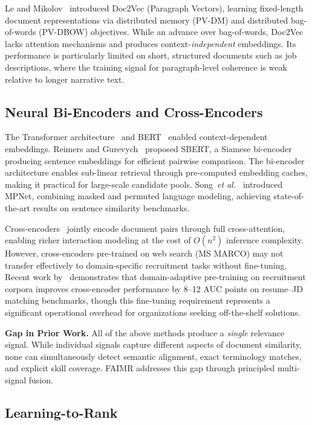 \documentclass[smallcondensed,numbers]{sn-jnl}
\begin{document}
Le and Mikolov~\cite{le2014doc2vec} introduced Doc2Vec (Paragraph Vectors), learning fixed-length document representations via distributed memory (PV-DM) and distributed bag-of-words (PV-DBOW) objectives. While an advance over bag-of-words, Doc2Vec lacks attention mechanisms and produces context-\textit{independent} embeddings. Its performance is particularly limited on short, structured documents such as job descriptions, where the training signal for paragraph-level coherence is weak relative to longer narrative text.

\subsection{Neural Bi-Encoders and Cross-Encoders}

The Transformer architecture~\cite{vaswani2017attention} and BERT~\cite{devlin2018bert} enabled context-dependent embeddings. Reimers and Gurevych~\cite{reimers2019sbert} proposed SBERT, a Siamese bi-encoder producing sentence embeddings for efficient pairwise comparison. The bi-encoder architecture enables sub-linear retrieval through pre-computed embedding caches, making it practical for large-scale candidate pools. Song~\textit{et al.}~\cite{song2020mpnet} introduced MPNet, combining masked and permuted language modeling, achieving state-of-the-art results on sentence similarity benchmarks.

Cross-encoders~\cite{nogueira2019crossencoder} jointly encode document pairs through full cross-attention, enabling richer interaction modeling at the cost of $O(n^2)$ inference complexity. However, cross-encoders pre-trained on web search (MS MARCO) may not transfer effectively to domain-specific recruitment tasks without fine-tuning. Recent work by~\cite{luo2023hire} demonstrates that domain-adaptive pre-training on recruitment corpora improves cross-encoder performance by 8--12 AUC points on resume--JD matching benchmarks, though this fine-tuning requirement represents a significant operational overhead for organizations seeking off-the-shelf solutions.

\textbf{Gap in Prior Work.} All of the above methods produce a \textit{single} relevance signal. While individual signals capture different aspects of document similarity, none can simultaneously detect semantic alignment, exact terminology matches, and explicit skill coverage. FAIMR addresses this gap through principled multi-signal fusion.

\subsection{Learning-to-Rank}
\end{document}
